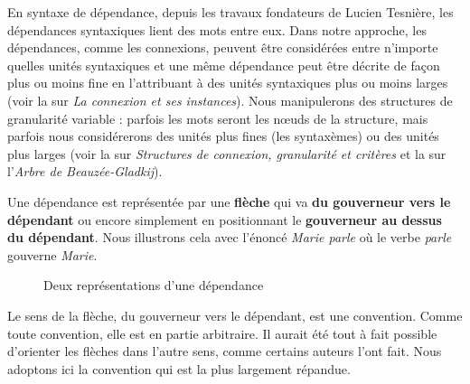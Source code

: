 En syntaxe de dépendance, depuis les travaux fondateurs de Lucien Tesnière, les dépendances syntaxiques lient des mots entre eux. Dans notre approche, les dépendances, comme les connexions, peuvent être considérées entre n’importe quelles unités syntaxiques et une même dépendance peut être décrite de façon plus ou moins fine en l’attribuant à des unités syntaxiques plus ou moins larges (voir la  sur \textit{La connexion et ses instances}). Nous manipulerons des structures de granularité variable : parfois les mots seront les nœuds de la structure, mais parfois nous considérerons des unités plus fines (les syntaxèmes) ou des unités plus larges (voir la  sur \textit{Structures de connexion, granularité et critères} et la  sur l’\textit{Arbre de Beauzée-Gladkij}).

Une dépendance est représentée par une \textbf{flèche} qui va \textbf{du gouverneur vers le dépendant} ou encore simplement en positionnant le \textbf{gouverneur au dessus du dépendant}. Nous illustrons cela avec l’énoncé \textit{Marie parle} où le verbe \textit{parle} gouverne \textit{Marie}.

\begin{figure}
\hspace{2cm}
\caption{\label{fig:}Deux représentations d’une dépendance}
\end{figure}

Le sens de la flèche, du gouverneur vers le dépendant, est une convention. Comme toute convention, elle est en partie arbitraire. Il aurait été tout à fait possible d’orienter les flèches dans l’autre sens, comme certains auteurs l’ont fait. Nous adoptons ici la convention qui est la plus largement répandue.

